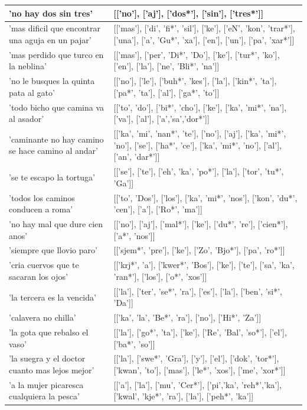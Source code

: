 \documentclass[11pt,a4paper,twoside]{tesis}
\begin{document}
\begin{longtable}{| p{} | p{} |}
'no hay dos sin tres' & [['no'], ['aj'], ['dos*'], ['sin'], ['tres*']] \\ \hline
'mas dificil que encontrar una aguja en un pajar' & [['mas'], ['di', 'fi*', 'sil'], ['ke'], ['eN', 'kon', 'trar*'], ['una'], ['a', 'Gu*', 'xa'], ['en'], ['un'], ['pa', 'xar*']] \\ \hline
'mas perdido que turco en la neblina' & [['mas'], ['per', 'Di*', 'Do'], ['ke'], ['tur*', 'ko'], ['en'], ['la'], ['ne', 'Bli*', 'na']] \\ \hline
'no le busques la quinta pata al gato' & [['no'], ['le'], ['buh*', 'kes'], ['la'], ['kin*', 'ta'], ['pa*', 'ta'], ['al'], ['ga*', 'to']] \\ \hline
'todo bicho que camina va al asador' & [['to', 'do'], ['bi*', 'cho'], ['ke'], ['ka', 'mi*', 'na'], ['va'], ['al'], ['a','sa','dor*']] \\ \hline
'caminante no hay camino se hace camino al andar' & [['ka', 'mi', 'nan*', 'te'], ['no'], ['aj'], ['ka', 'mi*', 'no'], ['se'], ['ha*', 'ce'], ['ka', 'mi*', 'no'], ['al'], ['an', 'dar*']] \\ \hline
'se te escapo la tortuga' & [['se'], ['te'], ['eh', 'ka', 'po*'], ['la'], ['tor', 'tu*', 'Ga']] \\ \hline
'todos los caminos conducen a roma' & [['to', 'Dos'], ['los'], ['ka', 'mi*', 'nos'], ['kon', 'du*', 'cen'], ['a'], ['Ro*', 'ma']] \\ \hline
'no hay mal que dure cien anos' & [['no'], ['aj'], ['mal*'], ['ke'], ['du*', 're'], ['cien*'], ['a*', 'nos']] \\ \hline
'siempre que llovio paro' & [['sjem*', 'pre'], ['ke'], ['Zo', 'Bjo*'], ['pa', 'ro*']] \\ \hline
'cria cuervos que te sacaran los ojos' & [['krj*', 'a'], ['kwer*', 'Bos'], ['ke'], ['te'], ['sa', 'ka', 'ran*'], ['los'], ['o*', 'xos']] \\ \hline
'la tercera es la vencida' & [['la'], ['ter', 'se*', 'ra'], ['es'], ['la'], ['ben', 'si*', 'Da']] \\ \hline
'calavera no chilla' & [['ka', 'la', 'Be*', 'ra'], ['no'], ['Hi*', 'Za']] \\ \hline
'la gota que rebalso el vaso' & [['la'], ['go*', 'ta'], ['ke'], ['Re', 'Bal', 'so*'], ['el'], ['ba*', 'so']] \\ \hline
'la suegra y el doctor cuanto mas lejos mejor' & [['la'], ['swe*', 'Gra'], ['y'], ['el'], ['dok', 'tor*'], ['kwan', 'to'], ['mas'], ['le*', 'xos'], ['me', 'xor*']] \\ \hline
'a la mujer picaresca cualquiera la pesca' & [['a'], ['la'], ['mu', 'Cer*'], ['pi','ka', 'reh*','ka'], ['kwal', 'kje*', 'ra'], ['la'], ['peh*', 'ka']] \\ \hline

\end{longtable}
\end{document}
